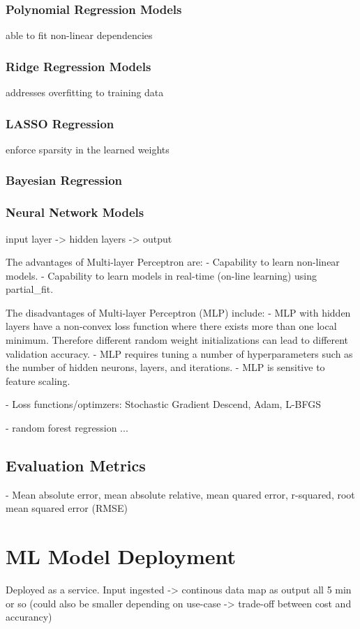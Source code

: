 \subsubsection{Polynomial Regression Models}
able to fit non-linear dependencies

\subsubsection{Ridge Regression Models}
addresses overfitting to training data

\subsubsection{LASSO Regression}
enforce sparsity in the learned weights

\subsubsection{Bayesian Regression}

\subsubsection{Neural Network Models}
input layer -> hidden layers -> output

The advantages of Multi-layer Perceptron are:
- Capability to learn non-linear models.
- Capability to learn models in real-time (on-line learning) using partial\_fit.

The disadvantages of Multi-layer Perceptron (MLP) include:
- MLP with hidden layers have a non-convex loss function where there exists more than one local minimum. Therefore different random weight initializations can lead to different validation accuracy.
- MLP requires tuning a number of hyperparameters such as the number of hidden neurons, layers, and iterations.
- MLP is sensitive to feature scaling.

- Loss functions/optimzers: Stochastic Gradient Descend, Adam, L-BFGS


- random forest regression
...

\subsection{Evaluation Metrics}
- Mean absolute error, mean absolute relative, mean quared error, r-squared, root mean squared error (RMSE)

\section{ML Model Deployment}
Deployed as a service. Input ingested -> continous data map as output all 5 min or so (could also be smaller depending on use-case -> trade-off between cost and accurancy)

